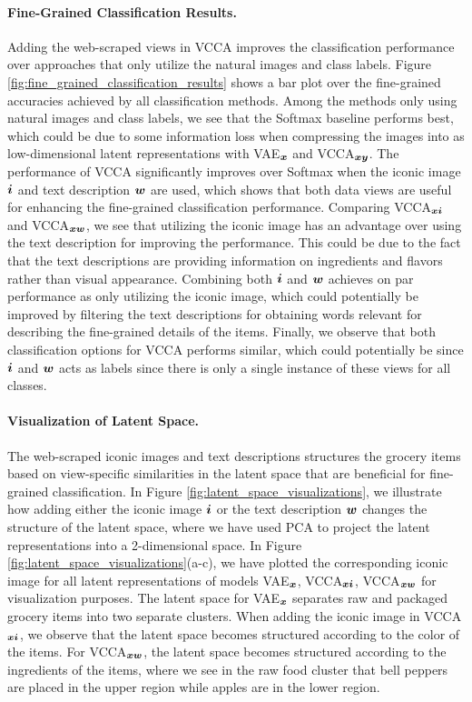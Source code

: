\paragraph{Fine-Grained Classification Results.} Adding the web-scraped views in VCCA improves the classification performance over approaches that only utilize the natural images and class labels. Figure \ref{fig:fine_grained_classification_results} shows a bar plot over the fine-grained accuracies achieved by all classification methods. Among the methods only using natural images and class labels, we see that the Softmax baseline performs best, which could be due to some information loss when compressing the images into as low-dimensional latent representations with VAE$_{{\bm{x}}}$ and VCCA$_{{\bm{x}} {\bm{y}}}$. The performance of VCCA significantly improves over Softmax when the iconic image ${\bm{i}}$ and text description ${\bm{w}}$ are used, which shows that both data views are useful for enhancing the fine-grained classification performance. Comparing VCCA$_{{\bm{x}} {\bm{i}}}$ and VCCA$_{{\bm{x}} {\bm{w}}}$, we see that utilizing the iconic image has an advantage over using the text description for improving the performance. This could be due to the fact that the text descriptions are providing information on ingredients and flavors rather than visual appearance. Combining both ${\bm{i}}$ and ${\bm{w}}$ achieves on par performance as only utilizing the iconic image, which could potentially be improved by filtering the text descriptions for obtaining words relevant for describing the fine-grained details of the items. Finally, we observe that both classification options for VCCA performs similar, which could potentially be since ${\bm{i}}$ and ${\bm{w}}$ acts as labels since there is only a single instance of these views for all classes.  



\paragraph{Visualization of Latent Space.} The web-scraped iconic images and text descriptions structures the grocery items based on view-specific similarities in the latent space that are beneficial for fine-grained classification. In Figure \ref{fig:latent_space_visualizations}, we illustrate how adding either the iconic image ${\bm{i}}$ or the text description ${\bm{w}}$ changes the structure of the latent space, where we have used PCA to project the latent representations into a 2-dimensional space. In Figure \ref{fig:latent_space_visualizations}(a-c), we have plotted the corresponding iconic image for all latent representations of models VAE$_{{\bm{x}}}$, VCCA$_{{\bm{x}} {\bm{i}}}$, VCCA$_{{\bm{x}} {\bm{w}}}$ for visualization purposes. The latent space for VAE$_{{\bm{x}}}$ separates raw and packaged grocery items into two separate clusters. When adding the iconic image in VCCA$_{{\bm{x}} {\bm{i}}}$, we observe that the latent space becomes structured according to the color of the items. For VCCA$_{{\bm{x}} {\bm{w}}}$, the latent space becomes structured according to the ingredients of the items, where we see in the raw food cluster that bell peppers are placed in the upper region while apples are in the lower region. 

